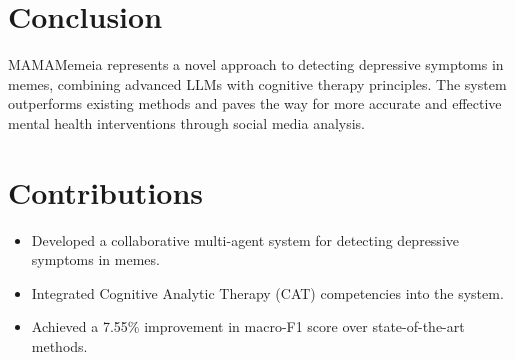 \documentclass{article}
\begin{document}
\section{Conclusion}
MAMAMemeia represents a novel approach to detecting depressive symptoms in memes, combining advanced LLMs with cognitive therapy principles. The system outperforms existing methods and paves the way for more accurate and effective mental health interventions through social media analysis.

\section{Contributions}
\begin{itemize}
    \item Developed a collaborative multi-agent system for detecting depressive symptoms in memes.
    \item Integrated Cognitive Analytic Therapy (CAT) competencies into the system.
    \item Achieved a 7.55\% improvement in macro-F1 score over state-of-the-art methods.
\end{itemize}
\end{document}
